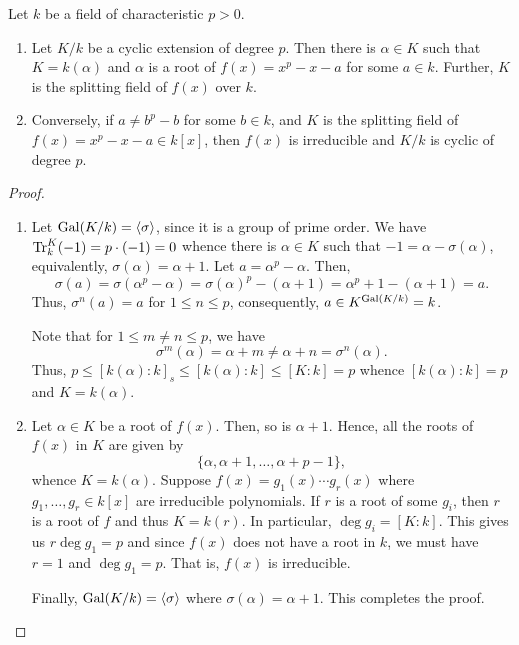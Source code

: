 \begin{theorem}
    Let $k$ be a field of characteristic $p > 0$.
    \begin{enumerate}[label=(\alph*)]
        \item Let $K/k$ be a cyclic extension of degree $p$. Then there is $\alpha\in K$ such that $K = k(\alpha)$ and $\alpha$ is a root of $f(x) = x^p - x - a$ for some $a\in k$. Further, $K$ is the splitting field of $f(x)$ over $k$.

        \item Conversely, if $a\ne b^p - b$ for some $b\in k$, and $K$ is the splitting field of $f(x) = x^p - x - a\in k[x]$, then $f(x)$ is irreducible and $K/k$ is cyclic of degree $p$.
    \end{enumerate}
\end{theorem}
\begin{proof}
\begin{enumerate}[label=(\alph*)]
    \item Let $\operatorname{Gal}(K/k) = \langle\sigma\rangle$, since it is a group of prime order. We have $\operatorname{Tr}^K_k(-1) = p\cdot(-1) = 0$ whence there is $\alpha\in K$ such that $-1 = \alpha - \sigma(\alpha)$, equivalently, $\sigma(\alpha) = \alpha + 1$. Let $a = \alpha^p - \alpha$. Then,
    \begin{equation*}
        \sigma(a) = \sigma(\alpha^p - \alpha) = \sigma(\alpha)^p - (\alpha + 1) = \alpha^p + 1 - (\alpha + 1) = a.
    \end{equation*}
    Thus, $\sigma^n(a) = a$ for $1\le n\le p$, consequently, $a\in K^{\operatorname{Gal}(K/k)} = k$. 

    Note that for $1\le m\ne n\le p$, we have 
    \begin{equation*}
        \sigma^m(\alpha) = \alpha + m\ne\alpha + n = \sigma^n(\alpha).
    \end{equation*}
    Thus, $p\le [k(\alpha):k]_s\le[k(\alpha):k]\le[K:k] = p$ whence $[k(\alpha):k] = p$ and $K = k(\alpha)$.

    \item Let $\alpha\in K$ be a root of $f(x)$. Then, so is $\alpha + 1$. Hence, all the roots of $f(x)$ in $K$ are given by 
    \begin{equation*}
        \{\alpha,\alpha + 1,\dots,\alpha + p - 1\},
    \end{equation*}
    whence $K = k(\alpha)$. Suppose $f(x) = g_1(x)\cdots g_r(x)$ where $g_1,\dots,g_r\in k[x]$ are irreducible polynomials. If $r$ is a root of some $g_i$, then $r$ is a root of $f$ and thus $K = k(r)$. In particular, $\deg g_i = [K:k]$. This gives us $r\deg g_1 = p$ and since $f(x)$ does not have a root in $k$, we must have $r = 1$ and $\deg g_1 = p$. That is, $f(x)$ is irreducible.

    Finally, $\operatorname{Gal}(K/k) = \langle\sigma\rangle$ where $\sigma(\alpha) = \alpha + 1$. This completes the proof.\qedhere
\end{enumerate}
\end{proof}


